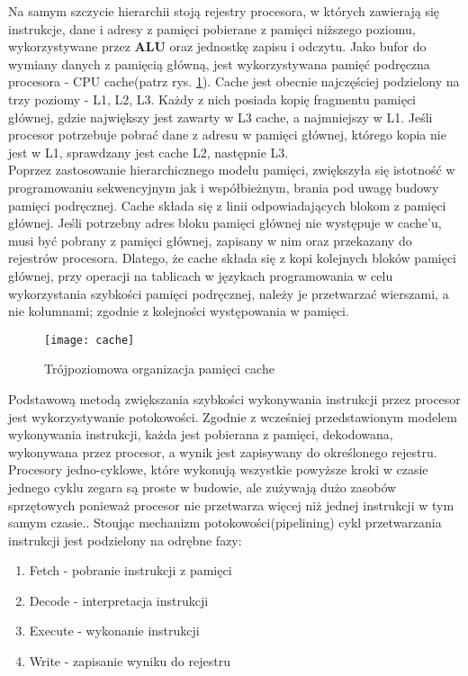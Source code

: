 \documentclass[document.tex]{subfiles}
\begin{document}
\indent Na samym szczycie hierarchii stoją rejestry procesora,
w których zawierają się instrukcje, dane i adresy z pamięci pobierane z pamięci niższego poziomu, wykorzystywane przez \textbf{ALU} oraz jednostkę zapisu i odczytu. Jako bufor do wymiany danych z pamięcią główną, jest wykorzystywana pamięć podręczna procesora - CPU cache(patrz rys. \ref{fig:cache_mem}).
Cache jest obecnie najczęściej podzielony na trzy poziomy - 
L1, L2, L3. Każdy z nich posiada kopię fragmentu pamięci głównej, gdzie największy jest zawarty w L3 cache, a najmniejszy w L1.
Jeśli procesor potrzebuje pobrać dane z adresu w pamięci głównej, którego kopia nie jest w L1, sprawdzany jest cache L2, 
następnie L3. 
\\
\indent Poprzez zastosowanie hierarchicznego modelu pamięci,
zwiększyła się istotność w programowaniu sekwencyjnym jak i współbieżnym, brania pod uwagę budowy pamięci podręcznej.
Cache składa się z linii odpowiadających blokom z pamięci głównej. Jeśli potrzebny adres bloku pamięci głównej
nie występuje w cache'u, musi być pobrany z pamięci głównej,
zapisany w nim oraz przekazany do rejestrów procesora. Dlatego, że cache składa się z kopi kolejnych bloków 
pamięci głównej, przy operacji na tablicach w językach programowania w celu wykorzystania szybkości pamięci podręcznej, należy je przetwarzać wierszami, a nie kolumnami;
zgodnie z kolejności występowania w pamięci.
\cite{Computer_Architecture_Patterson_Hennesy}\cite{OS_Stallings}\cite{Inside_Machine}
\begin{figure}[h]
\texttt{[image: cache]}
\caption{Trójpoziomowa organizacja pamięci cache \protect\cite{OS_Stallings}}
\label{fig:cache_mem}
\end{figure}

\indent Podstawową metodą zwiększania szybkości wykonywania instrukcji przez procesor jest wykorzystywanie potokowości.
Zgodnie z wcześniej przedstawionym modelem wykonywania instrukcji, każda jest pobierana z pamięci, dekodowana, wykonywana przez procesor, a wynik jest zapisywany do określonego rejestru. Procesory jedno-cyklowe, które wykonują wszystkie powyższe kroki w czasie jednego cyklu zegara są proste w budowie, ale zużywają dużo zasobów sprzętowych ponieważ procesor nie przetwarza więcej niż jednej instrukcji w tym samym czasie.\cite{Inside_Machine}. Stoując mechanizm potokowości(pipelining) cykl przetwarzania instrukcji jest podzielony na odrębne fazy:
\begin{enumerate}
\item Fetch - pobranie instrukcji z pamięci
\item Decode - interpretacja instrukcji
\item Execute - wykonanie instrukcji
\item Write - zapisanie wyniku do rejestru
\end{enumerate}
\end{document}

